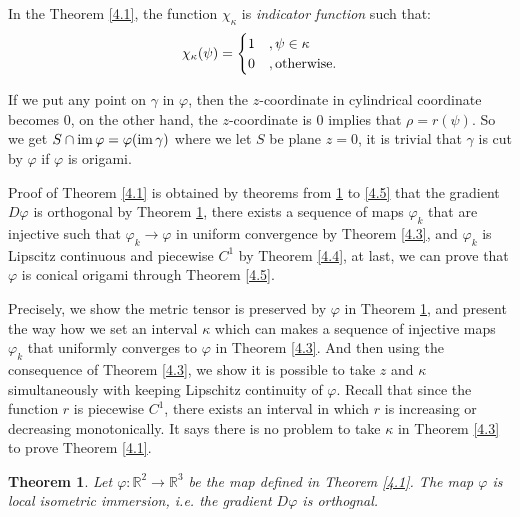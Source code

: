 \documentclass{amsart}
\theoremstyle{plain}
\newtheorem{theorem}{Theorem}[section]
\theoremstyle{definition}
\theoremstyle{remark}
\begin{document}
In the Theorem \ref{4.1}, the function $\chi_{\kappa}$ is {\it indicator function} such that:
\begin{align*}
\chi_{\kappa}(\psi)=
\begin{cases}
1&,\psi\in\kappa\\
0&,{\rm otherwise.}
\end{cases}
\end{align*}

If we put any point on $\gamma$ in $\varphi$, then the $z$-coordinate in cylindrical coordinate becomes 0, on the other hand, the $z$-coordinate is 0 implies that $\rho=r(\psi)$.
So we get $S\cap{\rm im}\,\varphi=\varphi({\rm im}\,\gamma)$ where we let $S$ be plane $z=0$, it is trivial that $\gamma$ is cut by $\varphi$ if $\varphi$ is origami.

Proof of Theorem \ref{4.1} is obtained by theorems from \ref{4.2} to \ref{4.5} that the gradient $D\varphi$ is orthogonal by Theorem \ref{4.2}, there exists a sequence of maps $\varphi_k$ that are injective such that $\varphi_k\to\varphi$ in uniform convergence by Theorem \ref{4.3}, and $\varphi_k$ is Lipscitz continuous and piecewise $C^1$ by Theorem \ref{4.4}, at last, we can prove that $\varphi$ is conical origami through Theorem \ref{4.5}.

Precisely, we show the metric tensor is preserved by $\varphi$ in Theorem \ref{4.2}, and present the way how we set an interval $\kappa$ which can makes a sequence of injective maps $\varphi_k$ that uniformly converges to $\varphi$ in Theorem \ref{4.3}.
And then using the consequence of Theorem \ref{4.3}, we show it is possible to take $z$ and $\kappa$ simultaneously with keeping Lipschitz continuity of $\varphi$.
Recall that since the function $r$ is piecewise $C^1$, there exists an interval in which $r$ is increasing or decreasing monotonically.
It says there is no problem to take $\kappa$ in Theorem \ref{4.3} to prove Theorem \ref{4.1}.


\begin{theorem}\label{4.2}%
Let $\varphi:{\mathbb R}^2\to{\mathbb R}^3$ be the map defined in Theorem \ref{4.1}. The map $\varphi$ is local isometric immersion, i.e. the gradient $D\varphi$ is orthognal.
\end{theorem}
\end{document}
